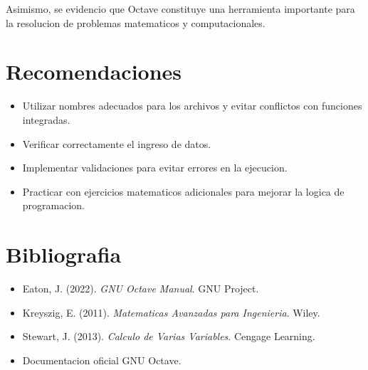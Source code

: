 \documentclass[12pt]{article}
\begin{document}
Asimismo, se evidencio que Octave constituye una herramienta importante para la resolucion de problemas matematicos y computacionales.


\section{Recomendaciones}

\begin{itemize}
\item Utilizar nombres adecuados para los archivos y evitar conflictos con funciones integradas.
\item Verificar correctamente el ingreso de datos.
\item Implementar validaciones para evitar errores en la ejecucion.
\item Practicar con ejercicios matematicos adicionales para mejorar la logica de programacion.
\end{itemize}


\section{Bibliografia}

\begin{itemize}
\item Eaton, J. (2022). \textit{GNU Octave Manual}. GNU Project.
\item Kreyszig, E. (2011). \textit{Matematicas Avanzadas para Ingenieria}. Wiley.
\item Stewart, J. (2013). \textit{Calculo de Varias Variables}. Cengage Learning.
\item Documentacion oficial GNU Octave.
\end{itemize}
\end{document}
